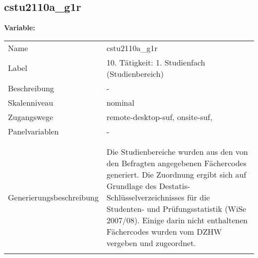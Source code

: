 	
	
	\subsection{cstu2110a\_g1r}
	\label{subSection:cstu2110a_g1r}

	\noindent\textbf{Variable:}\\
		\begin{tabular}{lL{11.3cm}}
			\label{tableVariable:cstu2110a_g1r}
			Name & cstu2110a\_g1r \\
			Label & 10. Tätigkeit: 1. Studienfach (Studienbereich) \\
			Beschreibung & - \\
			Skalenniveau & nominal \\
			Zugangswege &
				remote-desktop-suf,
				onsite-suf,
 \\
			Panelvariablen & -
			 \\
			 \\
 \\
					Generierungsbeschreibung & Die Studienbereiche wurden aus den von den Befragten angegebenen Fächercodes generiert. Die Zuordnung ergibt sich auf Grundlage des Destatis-Schlüsselverzeichnisses für die Studenten- und Prüfungsstatistik (WiSe 2007/08). Einige darin nicht enthaltenen Fächercodes wurden vom DZHW vergeben und zugeordnet. 
				 \\	
			 \\
		\end{tabular}






